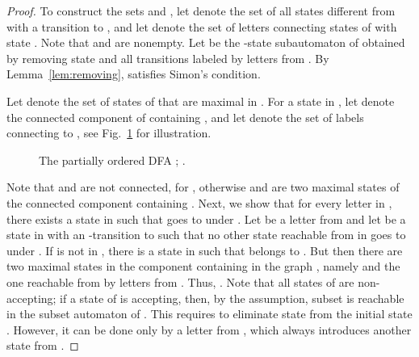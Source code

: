 \documentclass[runningheads]{llncs}
\begin{document}
\begin{proof}
    To construct the sets  and , 
    let  denote the set of all states different from  with a transition to ,
    and let  denote the set of letters connecting states of  with state .
    Note that  and  are nonempty.
    Let  be the -state subautomaton of  obtained by removing state 
    and all transitions labeled by letters from .
    By Lemma~\ref{lem:removing},  satisfies Simon's condition.
    
    Let  denote the set of states of  that are maximal in .
    For a state  in , let  denote the connected component of  containing ,
    and let  denote the set of labels connecting  to , see Fig.~\ref{fig:tree} for illustration.
    \begin{figure}[t]
      \centering
      \caption{The partially ordered DFA ; .}
      \label{fig:tree}
    \end{figure}
    Note that  and  are not connected, for , otherwise  and  are two maximal states of the connected component containing . Next, we show that for every letter  in , there exists a state  in  such that  goes to  under .
    Let  be a letter from  and let  be a state in  with an -transition to  such that no other state reachable from  in  goes to  under . If  is not in , there is a state  in  such that  belongs to . But then there are two maximal states in the component containing  in the graph , namely  and the one reachable from  by letters from . Thus, .
Note that all states of  are non-accepting; if a state  of  is accepting, then, by the assumption, subset  is reachable in the subset automaton of . This requires to eliminate state  from the initial state . However, it can be done only by a letter from , which always introduces another state from .
    

\end{proof}
\end{document}
